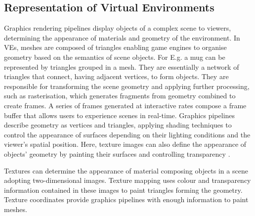 \subsection{Representation of Virtual Environments}
Graphics rendering pipelines display objects of a complex scene to viewers, determining the appearance of materials and geometry of the environment. In VEs, meshes are composed of triangles enabling game engines to organise geometry based on the semantics of scene objects. For E.g. a mug can be represented by triangles grouped in a mesh. They are essentially a network of triangles that connect, having adjacent vertices, to form objects. They are responsible for transforming the scene geometry and applying further processing, such as rasterisation, which generates fragments from geometry combined to create frames. A series of frames generated at interactive rates compose a frame buffer that allows users to experience scenes in real-time. Graphics pipelines describe geometry as vertices and triangles, applying shading techniques to control the appearance of surfaces depending on their lighting conditions and the viewer’s spatial position. Here, texture images can also define the appearance of objects' geometry by painting their surfaces and controlling transparency \citep{mcallister2002efficient, marschner2015fundamentals}.\par
Textures can determine the appearance of material composing objects in a scene adopting two-dimensional images. Texture mapping uses colour and transparency information contained in these images to paint triangles forming the geometry. Texture coordinates provide graphics pipelines with enough information to paint meshes.

